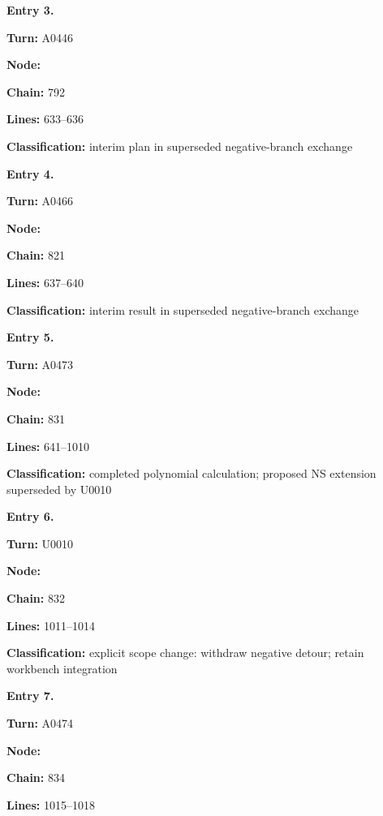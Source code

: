 
\textbf{Entry 3.}

\textbf{Turn:} A0446

\textbf{Node:} \protect{}

\textbf{Chain:} 792

\textbf{Lines:} 633--636

\textbf{Classification:} interim plan in superseded negative-branch
exchange


\textbf{Entry 4.}

\textbf{Turn:} A0466

\textbf{Node:} \protect{}

\textbf{Chain:} 821

\textbf{Lines:} 637--640

\textbf{Classification:} interim result in superseded negative-branch
exchange


\textbf{Entry 5.}

\textbf{Turn:} A0473

\textbf{Node:} \protect{}

\textbf{Chain:} 831

\textbf{Lines:} 641--1010

\textbf{Classification:} completed polynomial calculation; proposed NS
extension superseded by U0010


\textbf{Entry 6.}

\textbf{Turn:} U0010

\textbf{Node:} \protect{}

\textbf{Chain:} 832

\textbf{Lines:} 1011--1014

\textbf{Classification:} explicit scope change: withdraw negative
detour; retain workbench integration


\textbf{Entry 7.}

\textbf{Turn:} A0474

\textbf{Node:} \protect{}

\textbf{Chain:} 834

\textbf{Lines:} 1015--1018

